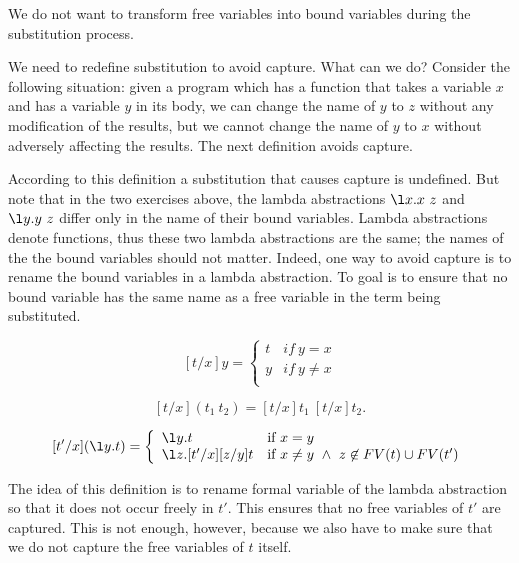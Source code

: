 We do not want to transform free variables into bound variables during
the substitution process. 

 We need to redefine substitution to avoid
capture. What can we do?  Consider the following situation: given a
program which has a function that takes a variable $x$ and has a
variable $y$ in its body, we can change the name of $y$ to $z$ without
any modification of the results, but we cannot change the name of $y$
to $x$ without adversely affecting the results. The next definition
avoids capture.
 



According to this definition a substitution that causes capture is
undefined.  But note that in the two exercises above, the lambda
abstractions $\l x.x~z$ and $\l y.y~z$ differ only in the name of
their bound variables.  
%
Lambda abstractions denote functions, thus
these two lambda abstractions are the same; the names of the
the bound variables should not matter.
%
Indeed, one way to avoid capture is to rename the bound variables in a
lambda abstraction.  To goal is to ensure that no bound variable has
the same name as a free variable in the term being substituted.


\begin{definition}
\label{def:lcsb::exp}
\[
[t/x]y = \left\{ \begin{array}{ll}
        t & if~y = x \\
        y & if~y\neq x \\
        \end{array} \right.
\]


\[
[t/x](t_1~t_2) = [t/x]t_1~[t/x]t_2.
 \]



\[[t'/x](\l y.t)  =
\left\{ \begin{array}{ll}
        \l y.t&\mbox{if}~x = y \\
        \l z. [t'/x] [z/y] t
        &\mbox{if}~ x \not= y ~ \land ~ z \not\in FV(t) \cup FV(t') \\
       \end{array} \right. \]
\end{definition}

The idea of this definition is to rename formal variable of the lambda
abstraction so that it does not occur freely in $t'$.  This ensures
that no free variables of $t'$ are captured.  This is not enough,
however, because we also have to make sure that we do not capture the
free variables of $t$ itself. 


